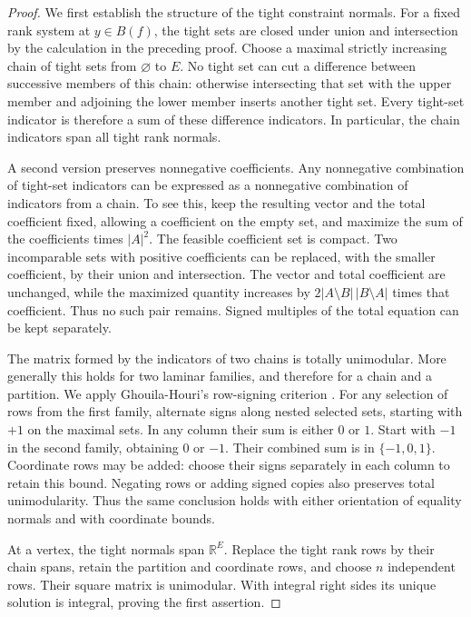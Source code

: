 \begin{proof}
We first establish the structure of the tight constraint normals.
For a fixed rank system at $y\in B(f)$, the tight sets are closed
under union and intersection by the calculation in the preceding
proof.  Choose a maximal strictly increasing chain of tight sets from
$\varnothing$ to $E$.  No tight set can cut a difference between
successive members of this chain: otherwise intersecting that set with
the upper member and adjoining the lower member inserts another tight
set.  Every tight-set indicator is therefore a sum of these difference
indicators.  In particular, the chain indicators span all tight rank
normals.

A second version preserves nonnegative coefficients.  Any nonnegative
combination of tight-set indicators can be expressed as a nonnegative
combination of indicators from a chain.  To see this, keep the resulting
vector and the total coefficient fixed, allowing a coefficient on the
empty set, and maximize the sum of the coefficients times $|A|^2$.
The feasible coefficient set is compact.  Two incomparable sets with
positive coefficients can be replaced, with the smaller coefficient,
by their union and intersection.  The vector and total coefficient
are unchanged, while the maximized quantity increases by
$2|A\setminus B|\,|B\setminus A|$ times that coefficient.
Thus no such pair remains.  Signed multiples of the total equation
can be kept separately.

The matrix formed by the indicators of two chains is totally
unimodular.  More generally this holds for two laminar families,
and therefore for a chain and a partition.  We apply Ghouila-Houri's
row-signing criterion
\cite[Chapter II, Section 3, fundamental theorem]{GH1964}.
For any selection of rows from the first
family, alternate signs along nested selected sets, starting with
$+1$ on the maximal sets.  In any column their sum is either $0$ or
$1$.  Start with $-1$ in the second family, obtaining $0$ or $-1$.
Their combined sum is in $\{-1,0,1\}$.  Coordinate rows may be added:
choose their signs separately in each column to retain this bound.
Negating rows or adding signed copies also preserves total
unimodularity.  Thus the same conclusion holds with either orientation
of equality normals and with coordinate bounds.

At a vertex, the tight normals span $\mathbb R^E$.  Replace the tight
rank rows by their chain spans, retain the partition and coordinate
rows, and choose $n$ independent rows.  Their square matrix is
unimodular.  With integral right sides its unique solution is integral,
proving the first assertion.


\end{proof}
